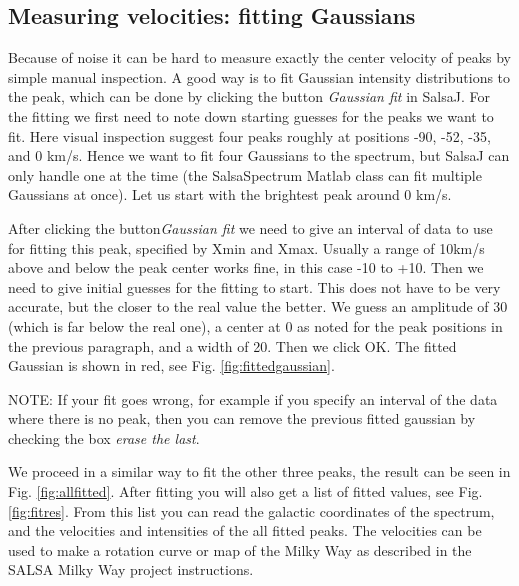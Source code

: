 \documentclass[11pt,a4paper]{article}
\begin{document}
\subsection{Measuring velocities: fitting Gaussians}
Because of noise it can be hard to measure exactly the center velocity
of peaks by simple manual inspection. A good way is to fit Gaussian
intensity distributions to the peak, which can be done by clicking the
button \emph{Gaussian fit} in SalsaJ. For the fitting we first need to
note down starting guesses for the peaks we want to fit. Here visual
inspection suggest four peaks roughly at positions -90, -52, -35, and 0 km/s. 
Hence we want to fit four Gaussians to the spectrum, but SalsaJ can only
handle one at the time (the SalsaSpectrum Matlab class can fit multiple Gaussians 
at once). Let us start with the brightest peak around 0 km/s. 

After clicking the button\emph{Gaussian fit} we need to give an interval of data to use
for fitting this peak, specified by Xmin and Xmax. Usually a range of 10km/s above and below the
peak center works fine, in this case -10 to +10. Then we need to give initial guesses for the fitting
to start. This does not have to be very accurate, but the closer to the real value the better.
We guess an amplitude of 30 (which is far below the real one), a center at 0 as noted for the 
peak positions in the previous paragraph, and a width of 20. Then we click OK. The fitted Gaussian
is shown in red, see Fig. \ref{fig:fittedgaussian}. 

NOTE: If your fit goes wrong, for example
if you specify an interval of the data where there is no peak, then you can remove the previous fitted
gaussian by checking the box \emph{erase the last}. 

We proceed in a similar way to fit the other three peaks, the result can be seen in Fig. 
\ref{fig:allfitted}. After fitting you will also get a list of fitted values, see Fig. 
\ref{fig:fitres}. From this list you can read the galactic coordinates of the spectrum, 
and the velocities and intensities of the all fitted peaks. The velocities can be used
to make a rotation curve or map of the Milky Way as described in the SALSA Milky Way project 
instructions.
\end{document}
